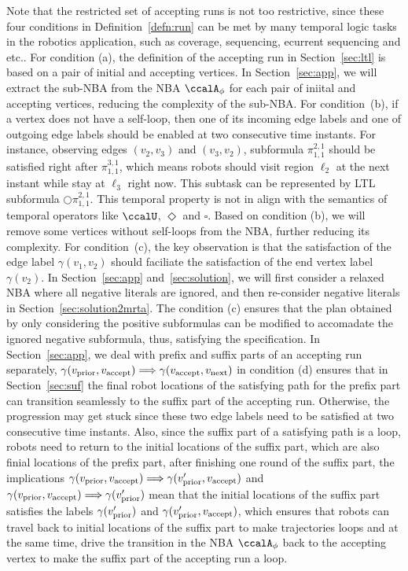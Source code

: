 \documentclass[Afour,sageh,times]{sagej}
\newcommand{\autop}{\ccalA_{\phi}}
\newcommand{\vertex}[1]{v_{\textup{#1}}}
\newcommand{\simplies}{\DOTSB\Longrightarrow}
\renewcommand{\ap}[3]{\mathcal{\pi}_{{#1},{#2}}^{#3}}
\begin{document}
Note that the restricted set of accepting runs is not too restrictive, since these four conditions in Definition~\ref{defn:run} can be met by many temporal logic tasks in the robotics application, such as coverage, sequencing, ecurrent sequencing and etc.. For condition (a), the definition of the accepting run in Section~\ref{sec:ltl} is based on a pair of initial and accepting vertices. In Section~\ref{sec:app}, we will extract the sub-NBA from the NBA $\autop$ for each pair of iniital and accepting vertices, reducing the complexity of the sub-NBA. For condition~{(b)}, if a vertex does not have a self-loop, then one of its incoming edge labels  and one of outgoing edge labels  should be enabled at two consecutive time instants. For instance, observing edges $(v_2, v_3)$ and $(v_3, v_2)$, subformula $\ap{1}{1}{2,1}$ should be satisfied right after $\ap{1}{1}{3,1}$, which means robots should visit region $\ell_2$ at the next instant while stay at $\ell_3$ right now. This subtask can be represented by LTL subformula $\bigcirc \ap{1}{1}{2,1}$. This temporal property is not in align with the semantics of temporal operators like $\ccalU$, $\Diamond$ and $\square$. Based on condition (b), we will remove some vertices without self-loops from the NBA, further reducing its complexity. For condition~{(c)}, the key observation is that the satisfaction of the edge label $\gamma(v_1, v_2)$ should faciliate the satisfaction of the end vertex label $\gamma(v_2)$.  In Section~\ref{sec:app} and~\ref{sec:solution}, we will first consider a relaxed NBA where all negative literals are ignored, and then re-consider negative literals in Section~\ref{sec:solution2mrta}. The condition (c) ensures that the plan obtained by only considering the positive subformulas can be modified to accomadate the ignored negative subformula, thus, satisfying the specification. In Section~\ref{sec:app}, we deal with prefix and suffix parts of an accepting run separately, $\gamma(\vertex{prior}, \vertex{accept}) \simplies  \gamma(\vertex{accept}, \vertex{next})$ in condition (d) ensures that in Section~\ref{sec:suf} the final robot locations of the satisfying path for  the prefix part can transition seamlessly to the suffix part of the accepting run. Otherwise, the progression may get stuck since these two edge labels need to be satisfied at two consecutive time instants. Also, since the suffix part of a satisfying path is a loop, robots need to return to the initial locations of the suffix part, which are also  finial locations of the prefix part, after finishing one round of the suffix part, the implications $\gamma(\vertex{prior}, \vertex{accept}) \simplies  \gamma(\vertex{prior}', \vertex{accept})$ and $\gamma(\vertex{prior}, \vertex{accept}) \simplies \gamma(\vertex{prior}')$ mean that the initial locations of the suffix part satisfies the labels $ \gamma(\vertex{prior}')$ and $\gamma(\vertex{prior}', \vertex{accept})$, which ensures that robots can travel back to initial locations of the suffix part  to make trajectories loops and at the same time, drive the transition in the NBA $\autop$ back to the accepting vertex to make the suffix part of the accepting run  a loop.
\end{document}
